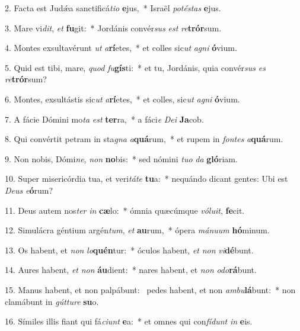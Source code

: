 2. Facta est Judǽa sanctificá\textit{ti}\textit{o} \textbf{e}jus,~*  Israël \textit{pot}\textit{és}\textit{tas} \textbf{e}jus.\

3. Mare vi\textit{dit}, \textit{et} \textbf{fu}git:~*  Jordánis convér\textit{sus} \textit{est} \textit{re}\textbf{trór}sum.\

4. Montes exsultavérunt \textit{ut} \textit{a}\textbf{rí}etes,~*  et colles sic\textit{ut} \textit{a}\textit{gni} \textbf{ó}vium.\

5. Quid est tibi, mare, \textit{quod} \textit{fu}\textbf{gís}ti:~*  et tu, Jordánis, quia convér\textit{sus} \textit{es} \textit{re}\textbf{trór}sum?\

6. Montes, exsultástis sic\textit{ut} \textit{a}\textbf{rí}etes,~*  et colles, sic\textit{ut} \textit{a}\textit{gni} \textbf{ó}vium.\

7. A fácie Dómini mo\textit{ta} \textit{est} \textbf{ter}ra,~*  a fáci\textit{e} \textit{De}\textit{i} \textbf{Ja}cob.\

8. Qui convértit petram in sta\textit{gna} \textit{a}\textbf{quá}rum,~*  et rupem in \textit{fon}\textit{tes} \textit{a}\textbf{quá}rum.\

9. Non nobis, Dómi\textit{ne}, \textit{non} \textbf{no}bis:~*  sed nómini \textit{tu}\textit{o} \textit{da} \textbf{gló}riam.\

10. Super misericórdia tua, et veri\textit{tá}\textit{te} \textbf{tu}a:~*  nequándo dicant gentes: Ubi est \textit{De}\textit{us} \textit{e}\textbf{ó}rum?\

11. Deus autem nos\textit{ter} \textit{in} \textbf{cæ}lo:~*  ómnia quæcúmque \textit{vó}\textit{lu}\textit{it}, \textbf{fe}cit.\

12. Simulácra géntium argén\textit{tum}, \textit{et} \textbf{au}rum,~*  ópera \textit{má}\textit{nu}\textit{um} \textbf{hó}minum.\

13. Os habent, et \textit{non} \textit{lo}\textbf{quén}tur:~*  óculos habent, \textit{et} \textit{non} \textit{vi}\textbf{dé}bunt.\

14. Aures habent, \textit{et} \textit{non} \textbf{áu}dient:~*  nares habent, et \textit{non} \textit{o}\textit{do}\textbf{rá}bunt.\

15. Manus habent, et non palpábunt: \dag\  pedes habent, et non \textit{am}\textit{bu}\textbf{lá}bunt:~*  non clamábunt in \textit{gút}\textit{tu}\textit{re} \textbf{su}o.\

16. Símiles illis fiant qui fá\textit{ci}\textit{unt} \textbf{e}a:~*  et omnes qui con\textit{fí}\textit{dunt} \textit{in} \textbf{e}is.\

